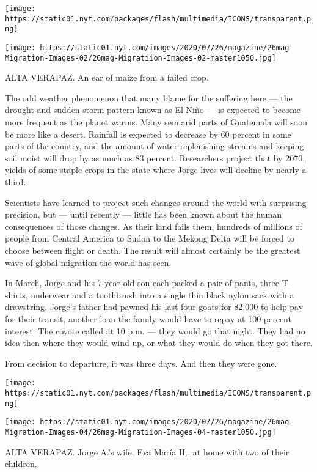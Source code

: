 \texttt{[image: https://static01.nyt.com/packages/flash/multimedia/ICONS/transparent.png]}

\texttt{[image: https://static01.nyt.com/images/2020/07/26/magazine/26mag-Migration-Images-02/26mag-Migratiion-Images-02-master1050.jpg]}

ALTA VERAPAZ. An ear of maize from a failed crop.

The odd weather phenomenon that many blame for the suffering here ---
the drought and sudden storm pattern known as El Niño --- is expected to
become more frequent as the planet warms. Many semiarid parts of
Guatemala will soon be more like a desert. Rainfall is expected to
decrease by 60 percent in some parts of the country, and the amount of
water replenishing streams and keeping soil moist will drop by as much
as 83 percent. Researchers project that by 2070, yields of some staple
crops in the state where Jorge lives will decline by nearly a third.

Scientists have learned to project such changes around the world with
surprising precision, but --- until recently --- little has been known
about the human consequences of those changes. As their land fails them,
hundreds of millions of people from Central America to Sudan to the
Mekong Delta will be forced to choose between flight or death. The
result will almost certainly be the greatest wave of global migration
the world has seen.

In March, Jorge and his 7-year-old son each packed a pair of pants,
three T-shirts, underwear and a toothbrush into a single thin black
nylon sack with a drawstring. Jorge's father had pawned his last four
goats for \$2,000 to help pay for their transit, another loan the family
would have to repay at 100 percent interest. The coyote called at 10
p.m. --- they would go that night. They had no idea then where they
would wind up, or what they would do when they got there.

From decision to departure, it was three days. And then they were gone.

\texttt{[image: https://static01.nyt.com/packages/flash/multimedia/ICONS/transparent.png]}

\texttt{[image: https://static01.nyt.com/images/2020/07/26/magazine/26mag-Migration-Images-04/26mag-Migratiion-Images-04-master1050.jpg]}

ALTA VERAPAZ. Jorge A.'s wife, Eva María H., at home with two of their
children.

